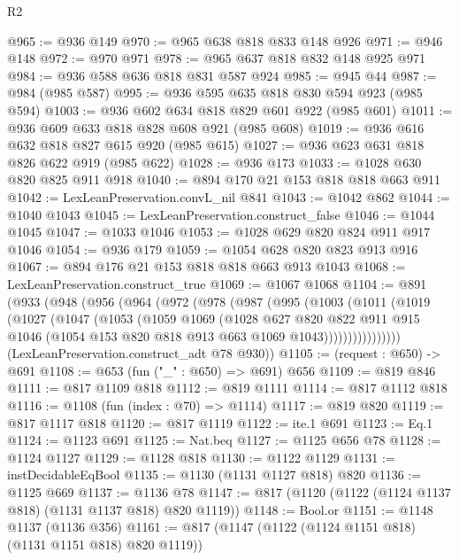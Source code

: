 \begin{lexlean}{R2}
\begin{coremodule}
@965 := @936 @149
@970 := @965 @638 @818 @833 @148 @926
@971 := @946 @148
@972 := @970 @971
@978 := @965 @637 @818 @832 @148 @925 @971
@984 := @936 @588 @636 @818 @831 @587 @924
@985 := @945 @44
@987 := @984 (@985 @587)
@995 := @936 @595 @635 @818 @830 @594 @923 (@985 @594)
@1003 := @936 @602 @634 @818 @829 @601 @922 (@985 @601)
@1011 := @936 @609 @633 @818 @828 @608 @921 (@985 @608)
@1019 := @936 @616 @632 @818 @827 @615 @920 (@985 @615)
@1027 := @936 @623 @631 @818 @826 @622 @919 (@985 @622)
@1028 := @936 @173
@1033 := @1028 @630 @820 @825 @911 @918
@1040 := @894 @170 @21 @153 @818 @818 @663 @911
@1042 := LexLeanPreservation.convL_nil @841
@1043 := @1042 @862
@1044 := @1040 @1043
@1045 := LexLeanPreservation.construct_false
@1046 := @1044 @1045
@1047 := @1033 @1046
@1053 := @1028 @629 @820 @824 @911 @917 @1046
@1054 := @936 @179
@1059 := @1054 @628 @820 @823 @913 @916
@1067 := @894 @176 @21 @153 @818 @818 @663 @913 @1043
@1068 := LexLeanPreservation.construct_true
@1069 := @1067 @1068
@1104 := @891
    (@933
      (@948
        (@956
          (@964
            (@972
              (@978
                (@987
                  (@995
                    (@1003
                      (@1011
                        (@1019
                          (@1027
                            (@1047
                              (@1053
                                (@1059
                                  @1069
                                  (@1028
                                    @627
                                    @820
                                    @822
                                    @911
                                    @915
                                    @1046
                                    (@1054 @153 @820 @818 @913 @663 @1069 @1043))))))))))))))))
      (LexLeanPreservation.construct_adt @78 @930))
@1105 := (request : @650) -> @691
@1108 := @653 (fun ("_" : @650) => @691) @656
@1109 := @819 @846
@1111 := @817 @1109 @818
@1112 := @819 @1111
@1114 := @817 @1112 @818
@1116 := @1108 (fun (index : @70) => @1114)
@1117 := @819 @820
@1119 := @817 @1117 @818
@1120 := @817 @1119
@1122 := ite.{1} @691
@1123 := Eq.{1}
@1124 := @1123 @691
@1125 := Nat.beq
@1127 := @1125 @656 @78
@1128 := @1124 @1127
@1129 := @1128 @818
@1130 := @1122 @1129
@1131 := instDecidableEqBool
@1135 := @1130 (@1131 @1127 @818) @820
@1136 := @1125 @669
@1137 := @1136 @78
@1147 := @817 (@1120 (@1122 (@1124 @1137 @818) (@1131 @1137 @818) @820 @1119))
@1148 := Bool.or
@1151 := @1148 @1137 (@1136 @356)
@1161 := @817 (@1147 (@1122 (@1124 @1151 @818) (@1131 @1151 @818) @820 @1119))

\end{coremodule}
\end{lexlean}

